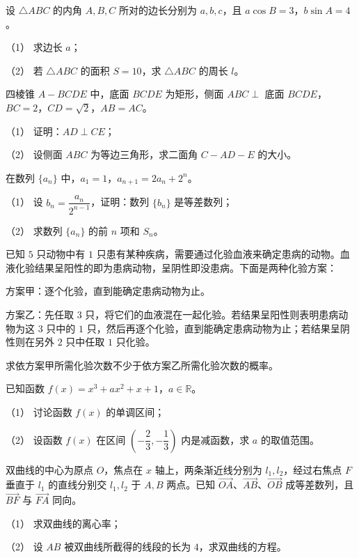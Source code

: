 \begin{question}
设 $\triangle ABC$ 的内角 $A,B,C$ 所对的边长分别为 $a,b,c$，且 $a\cos B=3$，$b\sin A=4$。

（1） 求边长 $a$；

（2） 若 $\triangle ABC$ 的面积 $S=10$，求 $\triangle ABC$ 的周长 $l$。

\Needspace{0.4\textheight}
\end{question}
\begin{question}
四棱锥 $A-BCDE$ 中，底面 $BCDE$ 为矩形，侧面 $ABC\perp$ 底面 $BCDE$，$BC=2$，$CD=\sqrt2$，$AB=AC$。
\nopagebreak[4]
\begin{center}\end{center}
\nopagebreak[4]
（1） 证明：$AD\perp CE$；

（2） 设侧面 $ABC$ 为等边三角形，求二面角 $C-AD-E$ 的大小。

\end{question}
\begin{question}
在数列 $\{a_n\}$ 中，$a_1=1$，$a_{n+1}=2a_n+2^n$。

（1） 设 $b_n=\dfrac{a_n}{2^{n-1}}$，证明：数列 $\{b_n\}$ 是等差数列；

（2） 求数列 $\{a_n\}$ 的前 $n$ 项和 $S_n$。

\end{question}
\begin{question}
已知 $5$ 只动物中有 $1$ 只患有某种疾病，需要通过化验血液来确定患病的动物。血液化验结果呈阳性的即为患病动物，呈阴性即没患病。下面是两种化验方案：

方案甲：逐个化验，直到能确定患病动物为止。

方案乙：先任取 $3$ 只，将它们的血液混在一起化验。若结果呈阳性则表明患病动物为这 $3$ 只中的 $1$ 只，然后再逐个化验，直到能确定患病动物为止；若结果呈阴性则在另外 $2$ 只中任取 $1$ 只化验。

求依方案甲所需化验次数不少于依方案乙所需化验次数的概率。

\end{question}
\begin{question}
已知函数 $f(x)=x^3+ax^2+x+1$，$a\in\mathbb R$。

（1） 讨论函数 $f(x)$ 的单调区间；

（2） 设函数 $f(x)$ 在区间 $\left(-\dfrac23,-\dfrac13\right)$ 内是减函数，求 $a$ 的取值范围。

\end{question}
\begin{question}
双曲线的中心为原点 $O$，焦点在 $x$ 轴上，两条渐近线分别为 $l_1,l_2$，经过右焦点 $F$ 垂直于 $l_1$ 的直线分别交 $l_1,l_2$ 于 $A,B$ 两点。已知 $\overrightarrow{OA}$、$\overrightarrow{AB}$、$\overrightarrow{OB}$ 成等差数列，且 $\overrightarrow{BF}$ 与 $\overrightarrow{FA}$ 同向。

（1） 求双曲线的离心率；

（2） 设 $AB$ 被双曲线所截得的线段的长为 $4$，求双曲线的方程。

\end{question}